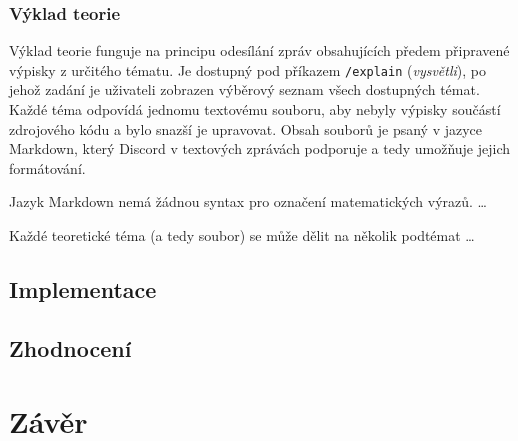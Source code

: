 \documentclass[FM]{tulthesis}
\begin{document}
	\subsection{Výklad teorie}
	
	Výklad teorie funguje na principu odesílání zpráv obsahujících předem připravené výpisky z určitého tématu. Je dostupný pod příkazem \verb*|/explain| (\textit{vysvětli}), po jehož zadání je uživateli zobrazen výběrový seznam všech dostupných témat. Každé téma odpovídá jednomu textovému souboru, aby nebyly výpisky součástí zdrojového kódu a bylo snazší je upravovat. Obsah souborů je psaný v jazyce Markdown, který Discord v textových zprávách podporuje a tedy umožňuje jejich formátování.
	
	Jazyk Markdown nemá žádnou syntax pro označení matematických výrazů. \dots
	
	Každé teoretické téma (a tedy soubor) se může dělit na několik podtémat \dots
	
			
	
	\section{Implementace}
	
	
	\section{Zhodnocení}
	
	
	\chapter{Závěr}
	
\end{document}
